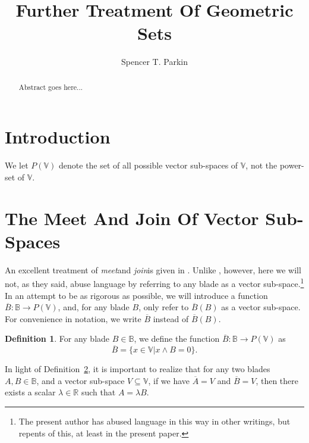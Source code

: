 \documentclass{birkjour}
\theoremstyle{definition}
\newtheorem{defn}[thm]{Definition}
\theoremstyle{remark}
\numberwithin{equation}{section}
\newcommand{\R}{\mathbb{R}}
\newcommand{\B}{\mathbb{B}}
\newcommand{\V}{\mathbb{V}}
\newcommand{\meet}{{\it meet}\;}
\newcommand{\join}{{\it join}\;}
\newcommand{\vecspace}{\overline}
\begin{document}
\title{Further Treatment Of Geometric Sets}

\author{Spencer T. Parkin}
\address{102 W. 500 S., \\
Salt Lake City, UT  84101} 



\begin{abstract}
Abstract goes here...
\end{abstract}


\maketitle

\section{Introduction}

We let $P(\V)$ denote the set of all possible vector sub-spaces of $\V$,
not the power-set of $\V$.

\section{The Meet And Join Of Vector Sub-Spaces}

An excellent treatment of \meet and \join is given in \cite{}.
Unlike \cite{}, however, here we will not, as they said, abuse language by referring to
any blade as a vector sub-space.\footnote{The present author has abused language
in this way in other writings, but repents of this, at least in the present paper.}  In an attempt to be as rigorous as possible,
we will introduce a function $\vecspace{B}:\B\to P(\V)$, and, for any blade $B$, only refer to
$\vecspace{B}(B)$ as a vector sub-space.  For convenience in notation, we write $\vecspace{B}$ instead
of $\vecspace{B}(B)$.
\begin{defn}
For any blade $B\in\B$, we define the function $\vecspace{B}:\B\to P(\V)$ as
\begin{equation}
\vecspace{B} = \{x\in\V|x\wedge B=0\}.
\end{equation}
\end{defn}

In light of Definition~\ref{}, it is important to realize that for any two blades $A,B\in\B$,
and a vector sub-space $V\subseteq\V$, if we have $\vecspace{A}=V$ and $\vecspace{B}=V$, then there
exists a scalar $\lambda\in\R$ such that $A=\lambda B$.
\end{document}
